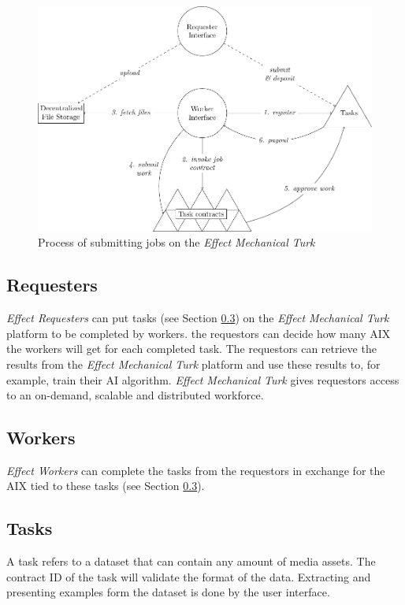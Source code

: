 \documentclass{article}
\begin{document}
\begin{figure}[htb]
  \includegraphics[width=\textwidth]{pictures/emt.pdf}
  \caption{Process of submitting jobs on the \emph{Effect Mechanical Turk}}
\end{figure}


\subsection{Requesters}
\emph{Effect Requesters} can put tasks (see Section
\ref{subsec:tasks}) on the \emph{Effect Mechanical Turk} platform to
be completed by workers. the requestors can decide how many AIX the
workers will get for each completed task. The requestors can retrieve
the results from the \emph{Effect Mechanical Turk} platform and use
these results to, for example, train their AI algorithm. \emph{Effect
  Mechanical Turk} gives requestors access to an on-demand, scalable
and distributed workforce.

\subsection{Workers}
\emph{Effect Workers} can complete the tasks from the requestors in
exchange for the AIX tied to these tasks (see Section
\ref{subsec:tasks}).

\subsection{Tasks}
\label{subsec:tasks}
A task refers to a dataset that can contain any amount of media
assets. The contract ID of the task will validate the format of the
data. Extracting and presenting examples form the dataset is done by
the user interface.
\end{document}
